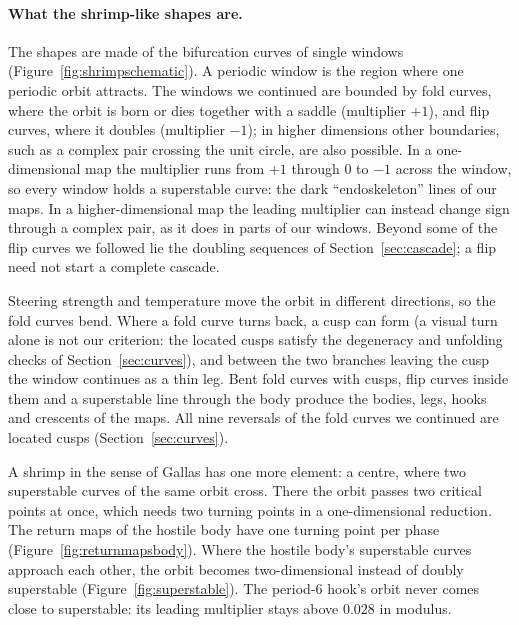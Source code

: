 \paragraph{What the shrimp-like shapes are.} The shapes are made of the bifurcation curves of single windows
(Figure~\ref{fig:shrimpschematic}). A periodic window is the region where one periodic orbit attracts. The windows
we continued are bounded by fold curves, where the orbit is born or dies together with a saddle (multiplier $+1$), and
flip curves, where it doubles (multiplier $-1$); in higher dimensions other boundaries, such as a complex pair crossing
the unit circle, are also possible. In a one-dimensional map the multiplier runs from $+1$ through $0$ to $-1$ across the
window, so every window holds a superstable curve: the dark ``endoskeleton'' lines of our maps. In a higher-dimensional
map the leading multiplier can instead change sign through a complex pair, as it does in parts of our windows. Beyond
some of the flip curves we followed lie the doubling sequences of Section~\ref{sec:cascade}; a flip need not start a
complete cascade.

Steering strength and temperature move the orbit in different directions, so the fold curves bend. Where a fold curve
turns back, a cusp can form (a visual turn alone is not our criterion: the located cusps satisfy the degeneracy and
unfolding checks of Section~\ref{sec:curves}), and between the two branches leaving the cusp the window continues as a
thin leg.
Bent fold curves with cusps, flip curves inside them and a superstable line through the body produce the bodies, legs,
hooks and crescents of the maps. All nine reversals of the fold curves we continued are located cusps
(Section~\ref{sec:curves}).

A shrimp in the sense of Gallas has one more element: a centre, where two superstable curves of the same orbit cross.
There the orbit passes two critical points at once, which needs two turning points in a one-dimensional reduction.
The return maps of the hostile body have one turning point per phase (Figure~\ref{fig:returnmapsbody}). Where the hostile body's superstable curves approach each other, the orbit becomes
two-dimensional instead of doubly superstable (Figure~\ref{fig:superstable}). The period-6 hook's orbit never comes
close to superstable: its leading multiplier stays above $0.028$ in modulus.

